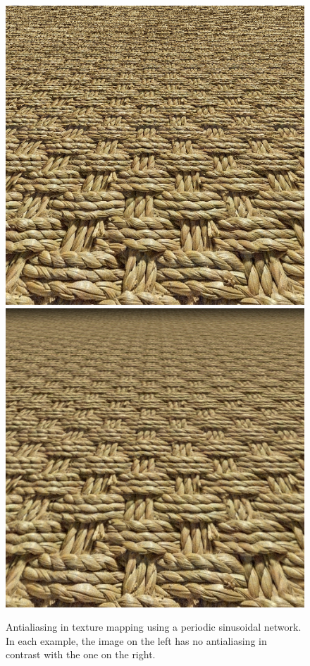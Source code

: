 \begin{figure}[!h]
    \centering
    \includegraphics[width=0.4\linewidth]{img/ch6/alias2.png}
    \includegraphics[width=0.4\linewidth]{img/ch6/anti_alias2.png}
    \caption{Antialiasing in texture mapping using a periodic sinusoidal network. In each example, the image on the left has no antialiasing in contrast with the one on the right.}
    \label{f:alias}
\end{figure}




